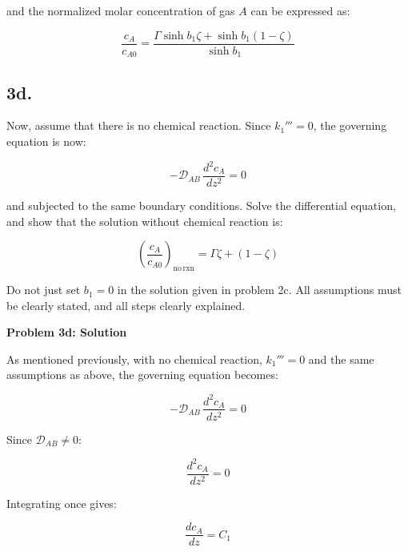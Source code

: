 \documentclass[letterpaper,12pt]{article}
\begin{document}
and the normalized molar concentration of gas $A$ can be expressed as:

\begin{equation}
\boxed{
    \frac{c_A}{c_{A0}} = \frac{\Gamma\sinh b_1\zeta + \sinh b_1(1 - \zeta)}{\sinh b_1}
}
\end{equation}



\subsection*{3d.}
Now, assume that there is no chemical reaction. Since $k_1''' = 0$, the
governing equation is now:

\begin{equation*}
    -\mathcal{D}_{AB}\,\frac{d^2 c_A}{dz^2} = 0
\end{equation*}

and subjected to the same boundary conditions. Solve the differential equation,
and show that the solution without chemical reaction is:

\begin{equation*}
    \left( \frac{c_A}{c_{A0}} \right)_{\mathrm{no \, rxn}} = \Gamma \zeta + (1 - \zeta)
\end{equation*}

Do not just set $b_1 = 0$ in the solution given in problem 2c. All assumptions
must be clearly stated, and all steps clearly explained.

\vspace{6pt}

\textbf{Problem 3d: Solution}

\vspace{6pt}

As mentioned previously, with no chemical reaction, $k_1''' = 0$ and the same assumptions as above, the governing equation becomes:

\begin{equation*}
    -\mathcal{D}_{AB}\,\frac{d^2 c_A}{dz^2} = 0
\end{equation*}

Since $\mathcal{D}_{AB} \neq 0$:

\begin{equation}
    \frac{d^2 c_A}{dz^2} = 0
\end{equation}

Integrating once gives: 

\begin{equation}
    \frac{dc_A}{dz} = C_1
\end{equation}
\end{document}
